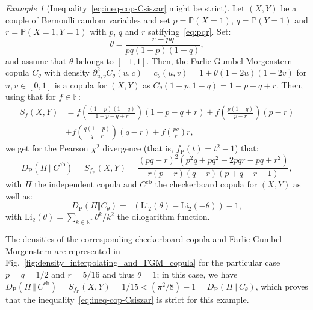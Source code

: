 \documentclass[12pt]{article}
\newcommand{\F}{{\mathbb F}}
\newcommand{\N}{{\mathbb N}}
\renewcommand{\P}{{\mathbb P}}
\newcommand{\inv}[1]{\mathop{\frac{1}{#1}}\nolimits}
\newcommand{\Cb}{C^\mathrm{cb}}
\theoremstyle{plain}
\theoremstyle{remark}
\newtheorem{exple}{Example}
\begin{document}
\begin{exple}[Inequality~\eqref{eq:ineq-cop-Csiszar} might be strict] 
  \label{exple:different_copula_give_different_index}
  Let  $(X,Y)$  be  a  couple  of Bernoulli  random  variables  and  set $p=\P(X=1)$,  $q=\P(Y=1)  $ and  $r=\P(X=1,Y=1) $ with $p$, $q$ and $r$ satifying~\eqref{eq:pqr}. 
Set:
  \[
    \theta = \frac{r-pq}{pq(1-p)(1-q)},
  \]
and assume that $\theta$ belongs to  $ [-1, 1]$. Then, 
the 
Farlie-Gumbel-Morgenstern copula $C_\theta$ with density 
 $    \partial^2_{u,v} C_\theta (u,c)=c_\theta(u,v) = 1+  \theta (1-2u)(1-2v)$  
 for $u,v\in [0, 1]$ is a copula for $(X,Y)$ as 
$C_\theta(1-p, 1-q) = 1-p-q+r$.
    Then, using that for $f\in \F$:
    \begin{align*}
      S_f(X,Y) &= f\left( \frac{(1-p)(1-q)}{1-p-q+r}\right) (1-p-q+r) 
      + f\left( \frac{p(1-q)}{p-r}\right) (p-r) \\
      &+ f\left( \frac{q(1-p)}{q-r}\right) (q-r) + f\left( \frac{pq}{r}\right) r, 
    \end{align*} 
we get for the Pearson $\chi^2$ divergence (that is, $f_\mathrm{P}(t)=t^2-1$)
that: 
\[
D_\mathrm{P}(\Pi \, \Vert\,  \Cb) =S_{f_\mathrm{P}}(X,Y)=  \frac{\left(p q -
        r\right)^{2} \left(p^{2} q + p q^{2} - 2 p q r - p q +
        r^{2}\right)}{r \left(p - r\right) \left(q - r\right) \left(p +
        q - r - 1\right)}  ,
\]
 with $\Pi$ the independent copula
 and $\Cb$ the  checkerboard copula for $(X,Y)$ as well as:
\[
   D_\mathrm{P}(\Pi \Vert C_\theta) = \inv{2 \theta} \left(\mathrm{Li}_2(\theta) - \mathrm{Li}_2(-\theta) \right) - 1,
\]
with  $\mathrm{Li}_2(\theta)=\sum_{k\in \N^*} \theta^k/k^2$  the dilogarithm function. 

The densities of the corresponding  checkerboard copula and 
Farlie-Gumbel-Morgenstern are represented in  Fig.~\ref{fig:density_interpolating_and_FGM_copula} for the particular case $p=q=1/2$ and $r=5/16$ and thus $\theta = 1$; in this case, we have $D_\mathrm{P}(\Pi \, \Vert\,  \Cb) =S_{f_\mathrm{P}} (X,Y)=1/15< (\pi^2/8) -1=D_\mathrm{P}(\Pi \, \Vert\,  C_\theta)$, which proves that the inequality~\eqref{eq:ineq-cop-Csiszar} is strict for this example. 
\end{exple}    
\end{document}
